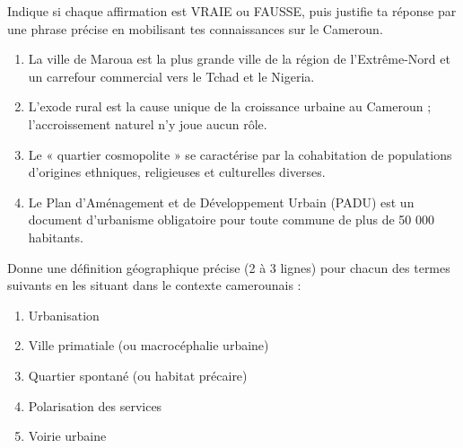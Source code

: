 \documentclass[11pt]{article}
\newcommand{\cle}[1]{{\popxbold\color{popdark}#1}}
\begin{document}
\begin{exercice}
Indique si chaque affirmation est VRAIE ou FAUSSE, puis justifie ta réponse par une phrase précise en mobilisant tes connaissances sur le Cameroun.
\begin{enumerate}
    \item La ville de Maroua est la plus grande ville de la région de l'Extrême-Nord et un carrefour commercial vers le Tchad et le Nigeria.
    \item L'exode rural est la cause unique de la croissance urbaine au Cameroun ; l'accroissement naturel n'y joue aucun rôle.
    \item Le « quartier cosmopolite » se caractérise par la cohabitation de populations d'origines ethniques, religieuses et culturelles diverses.
    \item Le Plan d'Aménagement et de Développement Urbain (PADU) est un document d'urbanisme obligatoire pour toute commune de plus de 50 000 habitants.
\end{enumerate}
\end{exercice}

\begin{exercice}
Donne une définition géographique précise (2 à 3 lignes) pour chacun des termes suivants en les situant dans le contexte camerounais :
\begin{enumerate}
    \item \cle{Urbanisation}
    \item \cle{Ville primatiale} (ou \cle{macrocéphalie urbaine})
    \item \cle{Quartier spontané} (ou \cle{habitat précaire})
    \item \cle{Polarisation des services}
    \item \cle{Voirie urbaine}
\end{enumerate}
\end{exercice}
\end{document}
